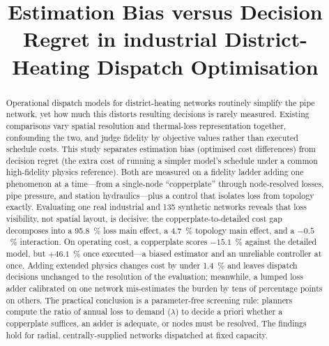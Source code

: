 \documentclass[a4paper,fleqn]{cas-sc}
\begin{document}
\title[mode=title]{%
  Estimation Bias versus Decision Regret in industrial District-Heating Dispatch Optimisation}

\begin{abstract}
Operational dispatch models for district-heating networks routinely simplify the
pipe network, yet how much this distorts resulting decisions is rarely measured.
Existing comparisons vary spatial resolution and thermal-loss representation
together, confounding the two, and judge fidelity by objective values rather than
executed schedule costs. This study separates estimation bias (optimised cost
differences) from decision regret (the extra cost of running a simpler model's
schedule under a common high-fidelity physics reference). Both are measured on a
fidelity ladder adding one phenomenon at a time---from a single-node
``copperplate'' through node-resolved losses, pipe pressure, and station
hydraulics---plus a control that isolates loss from topology exactly. Evaluating
one real industrial and 135 synthetic networks reveals that loss visibility, not
spatial layout, is decisive: the copperplate-to-detailed cost gap decomposes into
a 95.8~\% loss main effect, a 4.7~\% topology main effect, and a $-0.5$~\%
interaction. On operating cost, a copperplate scores $-15.1$~\% against the
detailed model, but $+46.1$~\% once executed---a biased estimator and an
unreliable controller at once. Adding
extended physics changes cost by under 1.4~\% and leaves dispatch decisions
unchanged to the resolution of the evaluation; meanwhile, a lumped loss adder
calibrated on one network mis-estimates the burden by tens of percentage points
on others. The practical conclusion is a parameter-free screening rule: planners
compute the ratio of annual loss to demand ($\lambda$) to decide a priori whether
a copperplate suffices, an adder is adequate, or nodes must be resolved. The
findings hold for radial, centrally-supplied networks dispatched at fixed
capacity.
\end{abstract}
\end{document}
